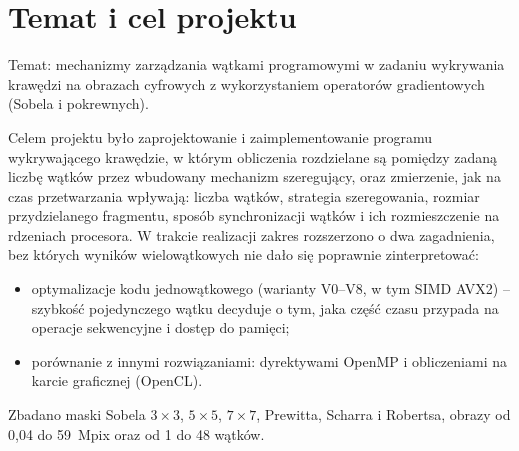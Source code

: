 \documentclass[12pt,a4paper]{article}
\begin{document}
\clearpage

\tableofcontents
\clearpage


\section{Temat i cel projektu}

Temat: mechanizmy zarządzania wątkami programowymi w zadaniu wykrywania krawędzi na obrazach cyfrowych z wykorzystaniem operatorów gradientowych (Sobela i pokrewnych).

Celem projektu było zaprojektowanie i zaimplementowanie programu wykrywającego krawędzie, w którym obliczenia rozdzielane są pomiędzy zadaną liczbę wątków przez wbudowany mechanizm szeregujący, oraz zmierzenie, jak na czas przetwarzania wpływają: liczba wątków, strategia szeregowania, rozmiar przydzielanego fragmentu, sposób synchronizacji wątków i ich rozmieszczenie na rdzeniach procesora. W trakcie realizacji zakres rozszerzono o dwa zagadnienia, bez których wyników wielowątkowych nie dało się poprawnie zinterpretować:
\begin{itemize}
	\item optymalizacje kodu jednowątkowego (warianty V0--V8, w tym SIMD AVX2) -- szybkość pojedynczego wątku decyduje o tym, jaka część czasu przypada na operacje sekwencyjne i dostęp do pamięci;
	\item porównanie z innymi rozwiązaniami: dyrektywami OpenMP i obliczeniami na karcie graficznej (OpenCL).
\end{itemize}
Zbadano maski Sobela $3\times3$, $5\times5$, $7\times7$, Prewitta, Scharra i Robertsa, obrazy od 0,04 do 59~Mpix oraz od 1 do 48 wątków.
\end{document}
